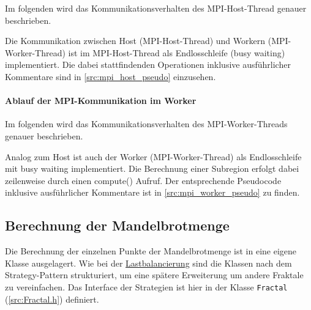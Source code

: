 Im folgenden wird das Kommunikationsverhalten des MPI-Host-Thread genauer beschrieben.


Die Kommunikation zwischen Host (MPI-Host-Thread) und Workern (MPI-Worker-Thread) ist im MPI-Host-Thread als Endlosschleife (busy waiting) implementiert. Die dabei stattfindenden Operationen inklusive ausführlicher Kommentare sind in \autoref{src:mpi_host_pseudo} einzusehen.

\begin{figure}[!h]
	
\end{figure}

\paragraph{Ablauf der MPI-Kommunikation im Worker}\label{para:impl_mpi_worker}

Im folgenden wird das Kommunikationsverhalten des MPI-Worker-Threads genauer beschrieben.

Analog zum Host ist auch der Worker (MPI-Worker-Thread) als Endlosschleife mit busy waiting implementiert. Die Berechnung einer Subregion erfolgt dabei zeilenweise durch einen compute() Aufruf. Der entsprechende Pseudocode inklusive ausführlicher Kommentare ist in \autoref{src:mpi_worker_pseudo} zu finden.

\begin{figure}[!h]
	
\end{figure}


\subsection{Berechnung der Mandelbrotmenge}\label{sec:mandelbrot_calculation}

Die Berechnung der einzelnen Punkte der Mandelbrotmenge ist in eine eigene Klasse ausgelagert.
Wie bei der \hyperref[sec:load_balancing]{Lastbalancierung} sind die Klassen nach dem Strategy-Pattern strukturiert, um eine spätere Erweiterung um andere Fraktale zu vereinfachen.
Das Interface der Strategien ist hier in der Klasse \verb|Fractal| (\autoref{src:Fractal.h}) definiert.

\begin{figure}
	
\end{figure}

